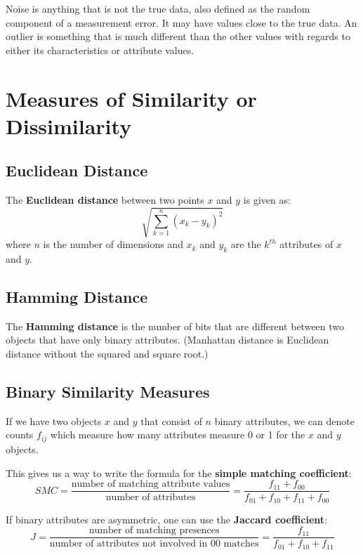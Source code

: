 \documentclass[12pt]{amsart}
\begin{document}
Noise is anything that is not the true data, also defined as the random component of a measurement error. It may have values close to the true data. An outlier is something that is much different than the other values with regards to either its characteristics or attribute values.

\section{Measures of Similarity or Dissimilarity}

\subsection{Euclidean Distance}
The \textbf{Euclidean distance} between two points $x$ and $y$ is given as:
\begin{equation*}
\sqrt{ \sum_{k=1}^n (x_k - y_k)^2 }
\end{equation*}
where $n$ is the number of dimensions and $x_k$ and $y_k$ are the $k^{th}$ attributes of $x$ and $y$.

\subsection{Hamming Distance}
The \textbf{Hamming distance} is the number of bits that are different between two objects that have only binary attributes. (Manhattan distance is Euclidean distance without the squared and square root.)

\subsection{Binary Similarity Measures}
If we have two objects $x$ and $y$ that consist of $n$ binary attributes, we can denote counts $f_{ij}$ which measure how many attributes measure 0 or 1 for the $x$ and $y$ objects. 

This gives us a way to write the formula for the \textbf{simple matching coefficient}:
\begin{equation*}
SMC = \frac{\text{number of matching attribute values}}{\text{number of attributes}} = \frac{f_{11} + f_{00}}{f_{01} + f_{10} + f_{11} + f_{00}}
\end{equation*}


If binary attributes are asymmetric, one can use the \textbf{Jaccard coefficient}:
\begin{equation*}
J = \frac{\text{number of matching presences}}{\text{number of attributes not involved in 00 matches}} = \frac{f_{11}}{f_{01} + f_{10} + f_{11}}
\end{equation*}
\end{document}
